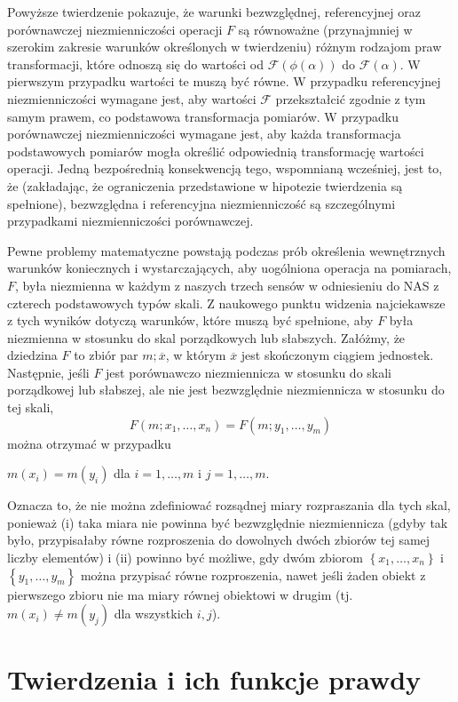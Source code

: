 \documentclass[12pt,a4paper]{report}
\newcommand{\zbior}[1]{\left\lbrace {#1} \right\rbrace }
\begin{document}
Powyższe twierdzenie pokazuje, że warunki bezwzględnej, referencyjnej oraz porównawczej niezmienniczości operacji $F$ są równoważne (przynajmniej w szerokim zakresie warunków określonych w twierdzeniu) różnym rodzajom praw transformacji, które odnoszą się do wartości od $\mathcal{F}(\phi(\alpha))$ do $\mathcal{F}(\alpha)$. W pierwszym przypadku wartości te muszą być równe. W przypadku referencyjnej niezmienniczości wymagane jest, aby wartości $\mathcal{F}$ przekształcić zgodnie z tym samym prawem, co podstawowa transformacja pomiarów. W przypadku porównawczej niezmienniczości  wymagane jest, aby każda transformacja podstawowych pomiarów mogła określić odpowiednią transformację wartości operacji. Jedną bezpośrednią konsekwencją tego, wspomnianą wcześniej, jest to, że (zakładając, że ograniczenia przedstawione w hipotezie twierdzenia są spełnione), bezwzględna i referencyjna niezmienniczość są szczególnymi przypadkami niezmienniczości porównawczej.

Pewne problemy matematyczne powstają podczas prób określenia wewnętrznych warunków koniecznych i wystarczających, aby uogólniona operacja na pomiarach, $F$, była niezmienna w każdym z naszych trzech sensów w odniesieniu do NAS z czterech podstawowych typów skali. Z naukowego punktu widzenia najciekawsze z tych wyników dotyczą warunków, które muszą być spełnione, aby $F$ była niezmienna w stosunku do skal porządkowych lub słabszych. Załóżmy, że dziedzina $F$ to zbiór par $m; \overline{x}$, w którym $\overline{x}$ jest skończonym ciągiem jednostek. Następnie, jeśli $F$ jest porównawczo niezmiennicza w stosunku do skali porządkowej lub słabszej, ale nie jest
bezwzględnie niezmiennicza w stosunku do tej skali,
\begin{equation*}
F(m;x_{1},\dots,x_{n})=F(m;y_{1},\dots,y_{m})
\end{equation*}
można otrzymać w przypadku
\begin{center}
$m(x_{i})=m(y_{i})$ dla $i=1,\dots,m$ i $j=1,\dots,m$.
\end{center}
Oznacza to, że nie można zdefiniować rozsądnej miary rozpraszania dla tych skal, ponieważ (i) taka miara nie powinna być bezwzględnie niezmiennicza (gdyby tak było, przypisałaby równe rozproszenia do dowolnych dwóch zbiorów tej samej liczby elementów) i (ii) powinno być możliwe, gdy dwóm zbiorom $\zbior{x_{1},\dots,x_{n}}$  i$\zbior{y_{1},\dots,y_{m}}$ można przypisać równe rozproszenia, nawet jeśli żaden obiekt z pierwszego zbioru nie ma miary równej obiektowi w drugim (tj.$ m(x_{i})\neq m(y_{j})$  dla wszystkich $i, j$).
\section{Twierdzenia i ich funkcje prawdy}
\end{document}
